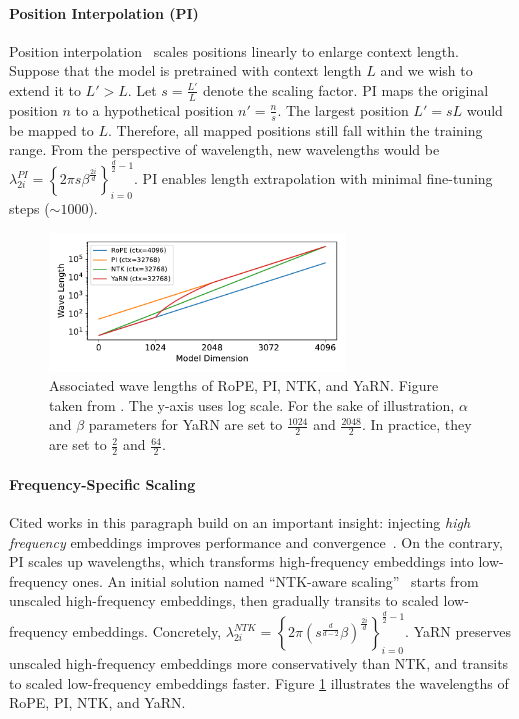 \documentclass[11pt, a4paper, logo, copyright, nonumbering]{map}
\begin{document}
\paragraph{Position Interpolation (PI)}
Position interpolation~\citep{chen2023extending} scales positions linearly to enlarge context length. 
Suppose that the model is pretrained with context length \(L\) and we wish to extend it to \(L'> L\).
Let \(s =\frac{L'}{L}\) denote the scaling factor. 
PI maps the original position \(n\) to a hypothetical position \(n' = \frac{n}{s}\). The largest position \(L'= sL\) would be mapped to \(L\). 
Therefore, all mapped positions still fall within the training range. 
From the perspective of wavelength, new wavelengths would be \(\lambda_{2i}^{PI} =\left\{  2\pi s \beta^{\frac{2i}{d}}\right\}_{i = 0}^{\frac{d}{2}- 1} \). 
PI enables length extrapolation with minimal fine-tuning steps (\(\sim 1000\)).
\begin{figure}[!htp]
    \centering
    \includegraphics[width=0.7\textwidth]{Sec7_Interpretability/wave_lengths.pdf}
    \caption{Associated wave lengths of RoPE, PI, NTK, and YaRN. Figure taken from \citet{peng2023yarn}. The y-axis uses log scale. For the sake of illustration, \(\alpha\) and \(\beta\) parameters for YaRN are set to \(\frac{1024}{2}\) and \(\frac{2048}{2}\). In practice, they are set to \(\frac{2}{2}\) and \(\frac{64}{2}\).} %
    \label{fig:rope_wave_lengths}
  \end{figure}
\paragraph{Frequency-Specific Scaling}
Cited works in this paragraph build on an important insight: injecting \textit{high frequency} embeddings improves performance and convergence~\citep{nips_fourier_high_freq}. On the contrary, PI scales up wavelengths, which transforms high-frequency embeddings into low-frequency ones. An initial solution named ``NTK-aware scaling''~\citep{ntk_aware_reddit} starts from unscaled high-frequency embeddings, then gradually transits to scaled low-frequency embeddings. Concretely, \(\lambda_{2i}^{NTK} =\left\{ 2\pi \left( s ^{\frac{d}{d - 2}}\beta \right)^{\frac{2i}{d}}  \right\}_{i = 0}^{\frac{d}{2}- 1} \). YaRN preserves unscaled high-frequency embeddings more conservatively than NTK, and transits to scaled low-frequency embeddings faster. Figure \ref{fig:rope_wave_lengths} illustrates the wavelengths of RoPE, PI, NTK, and YaRN.
\end{document}
